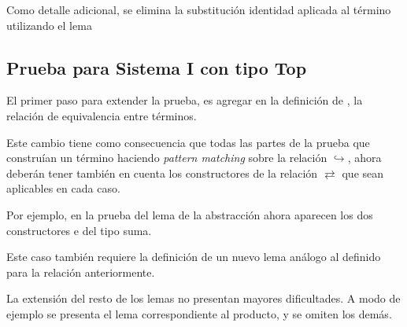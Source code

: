 Como detalle adicional, se elimina la substitución identidad aplicada al término utilizando el lema
\AgdaSymbol{:}
\AgdaSymbol{\}}
\AgdaSymbol{\{}
\AgdaSymbol{:}
\AgdaSymbol{\}}


\subsection{Prueba para Sistema I con tipo Top}

El primer paso para extender la prueba, es agregar en la definición de , la relación de equivalencia entre términos.


Este cambio tiene como consecuencia que todas las partes de la prueba que construían un término \snstar haciendo \textit{pattern matching} sobre la relación $\hookrightarrow$, ahora deberán tener también en cuenta los constructores de la relación $\rightleftarrows$ que sean aplicables en cada caso.

\iffalse
Por ejemplo, en la prueba de \func{SN*-rename} ahora aparecen los dos constructores \const{inj₁} y \const{inj₂} del tipo suma.

\ExecuteMetaData[code/strong_norm.tex]{sn-rename}

Para esta prueba es necesario definir un nuevo lema análogo a \func{rename↪}.

\ExecuteMetaData[code/strong_norm.tex]{rename-iso-type}

Una modificación similar se realiza para extender el lema de la abstracción.
\fi

Por ejemplo, en la prueba del lema de la abstracción ahora aparecen los dos constructores  e  del tipo suma.


Este caso también requiere la definición de un nuevo lema análogo al definido para la relación  anteriormente.


La extensión del resto de los lemas no presentan mayores dificultades.
A modo de ejemplo se presenta el lema correspondiente al producto, y se omiten los demás.

